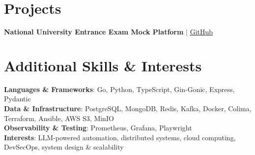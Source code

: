 \section{Projects}
  \resumeSubHeadingListStart
    \resumeProjectHeading
      {\textbf{National University Entrance Exam Mock Platform} $|$ \href{https://github.com/vityasyyy/omah-to}{\underline{GitHub}}}{}
      \resumeItemListStart
      \resumeItemListEnd
  \resumeSubHeadingListEnd

\section{Additional Skills \& Interests}
 \begin{itemize}[leftmargin=0.15in, label={}]
    \small{\item{
     \textbf{Languages \& Frameworks}{: Go, Python, TypeScript, Gin-Gonic, Express, Pydantic} \\ \vspace{2pt}
     \textbf{Data \& Infrastructure}{: PostgreSQL, MongoDB, Redis, Kafka, Docker, Colima, Terraform, Ansible, AWS S3, MinIO} \\ \vspace{2pt}
     \textbf{Observability \& Testing}{: Prometheus, Grafana, Playwright} \\ \vspace{2pt}
     \textbf{Interests}{: LLM-powered automation, distributed systems, cloud computing, DevSecOps, system design \& scalability}
    }}
 \end{itemize}


